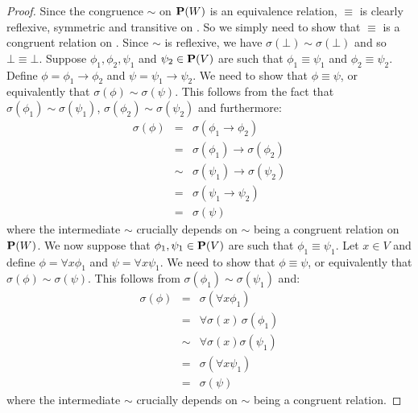 \begin{proof}
Since the congruence $\sim$ on ${\bf P}(W)$ is an equivalence
relation, $\equiv$ is clearly reflexive, symmetric and transitive on
\pv. So we simply need to show that $\equiv$ is a congruent relation
on \pv. Since $\sim$ is reflexive, we have
$\sigma(\bot)\sim\sigma(\bot)$ and so $\bot\equiv\bot$. Suppose
$\phi_{1},\phi_{2},\psi_{1}$ and $\psi_{2}\in\mbox{${\bf P}(V)$}$ are such that
$\phi_{1}\equiv\psi_{1}$ and $\phi_{2}\equiv\psi_{2}$. Define
$\phi=\phi_{1}\to\phi_{2}$ and $\psi=\psi_{1}\to\psi_{2}$. We need
to show that $\phi\equiv\psi$, or equivalently that
$\sigma(\phi)\sim\sigma(\psi)$. This follows from the fact that
$\sigma(\phi_{1})\sim\sigma(\psi_{1})$,
$\sigma(\phi_{2})\sim\sigma(\psi_{2})$ and furthermore:
    \begin{eqnarray*}
    \sigma(\phi)&=&\sigma(\phi_{1}\to\phi_{2})\\
    &=&\sigma(\phi_{1})\to\sigma(\phi_{2})\\
    &\sim&\sigma(\psi_{1})\to\sigma(\psi_{2})\\
    &=&\sigma(\psi_{1}\to\psi_{2})\\
    &=&\sigma(\psi)
    \end{eqnarray*}
where the intermediate $\sim$ crucially depends on $\sim$ being a
congruent relation on ${\bf P}(W)$. We now suppose that
$\phi_{1},\psi_{1}\in\mbox{${\bf P}(V)$}$ are such that $\phi_{1}\equiv\psi_{1}$.
Let $x\in V$ and define $\phi=\forall x\phi_{1}$ and $\psi=\forall
x\psi_{1}$. We need to show that $\phi\equiv\psi$, or equivalently
that $\sigma(\phi)\sim\sigma(\psi)$. This follows from
$\sigma(\phi_{1})\sim\sigma(\psi_{1})$ and:
    \begin{eqnarray*}
    \sigma(\phi)&=&\sigma(\forall x\phi_{1})\\
    &=&\forall\sigma(x)\,\sigma(\phi_{1})\\
    &\sim&\forall\sigma(x)\sigma(\psi_{1})\\
    &=&\sigma(\forall x\psi_{1})\\
    &=&\sigma(\psi)
    \end{eqnarray*}
where the intermediate $\sim$ crucially depends on $\sim$ being a
congruent relation.
\end{proof}
